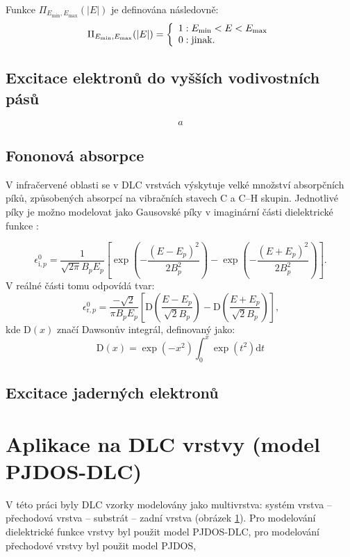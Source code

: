 Funkce $\Pi_{E_\mathrm{min},E_\mathrm{max}}(|E|)$ je definována následovně:
\begin{equation}
\Pi_{E_\mathrm{min},E_\mathrm{max}}(|E|) = 
	\left\{\begin{array}{l l} 
	1 : E_\mathrm{min} < E < E_\mathrm{max} \\
	0 : \text{jinak.} \end{array} \right.
\end{equation}

\subsection{Excitace elektronů do vyšších vodivostních pásů}
\begin{equation}
a
\end{equation}


\subsection{Fononová absorpce}
V infračervené oblasti se v DLC vrstvách výskytuje velké množství absorpčních píků, způsobených absorpcí na vibračních stavech C a C--H skupin. Jednotlivé píky je možno modelovat jako Gausovské píky v imaginární části dielektrické funkce \cite{franta2007}:

\begin{equation}
\epsilon^0_{\mathrm{i},p} = \frac{1}{\sqrt{2 \pi} B_p E_p} \left[ \exp\left(-\frac{(E-E_p)^2}{2B_p^2}\right) - \exp\left(-\frac{(E+E_p)^2}{2B_p^2}\right) \right] \text{.}
\end{equation}
V reálné části tomu odpovídá tvar:
\begin{equation}
\epsilon^0_{\mathrm{r},p} = \frac{-\sqrt{2}}{\pi B_p E_p} \left[ \mathrm{D}\left(\frac{E-E_p}{\sqrt{2}B_p}\right) - \mathrm{D}\left(\frac{E+E_p}{\sqrt{2}B_p}\right) \right] \text{,}
\end{equation}
kde $\mathrm{D}(x)$ značí Dawsonův integrál, definovaný jako:
\begin{equation}
\mathrm{D}(x) = \exp(-x^2)\int_0^x \exp(t^2) \mathrm{d}t
\end{equation}

\subsection{Excitace jaderných elektronů}



\section{Aplikace na DLC vrstvy (model PJDOS-DLC)}
V této práci byly DLC vzorky modelovány jako multivrstva: systém vrstva -- přechodová vrstva -- substrát -- zadní vrstva (obrázek \ref{}). Pro modelování dielektrické funkce vrstvy byl použit model PJDOS-DLC, pro modelování přechodové vrstvy byl použit model PJDOS, 

